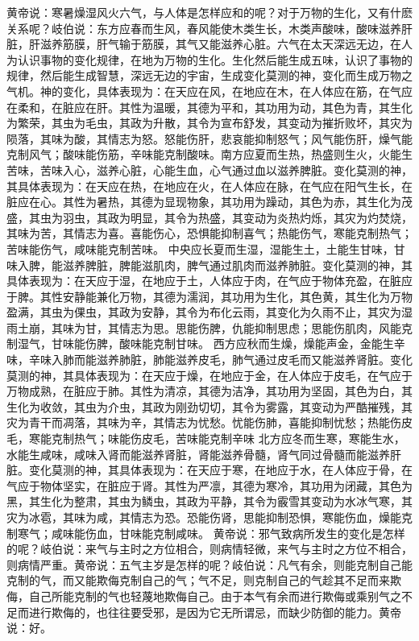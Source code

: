 \documentclass[a4paper,12pt,UTF8,twoside]{ctexbook}
\begin{document}
黄帝说：寒暑燥湿风火六气，与人体是怎样应和的呢？对于万物的生化，又有什麽关系呢？岐伯说：东方应春而生风，春风能使木类生长，木类声酸味，酸味滋养肝脏，肝滋养筋膜，肝气输于筋膜，其气又能滋养心脏。六气在太天深远无边，在人为认识事物的变化规律，在地为万物的生化。生化然后能生成五味，认识了事物的规律，然后能生成智慧，深远无边的宇宙，生成变化莫测的神，变化而生成万物之气机。神的变化，具体表现为：在天应在风，在地应在木，在人体应在筋，在气应在柔和，在脏应在肝。其性为温暖，其德为平和，其功用为动，其色为青，其生化为繁荣，其虫为毛虫，其政为升散，其令为宣布舒发，其变动为摧折败坏，其灾为陨落，其味为酸，其情志为怒。怒能伤肝，悲哀能抑制怒气；风气能伤肝，燥气能克制风气；酸味能伤筋，辛味能克制酸味。南方应夏而生热，热盛则生火，火能生苦味，苦味入心，滋养心脏，心能生血，心气通过血以滋养脾脏。变化莫测的神，其具体表现为：在天应在热，在地应在火，在人体应在脉，在气应在阳气生长，在脏应在心。其性为暑热，其德为显现物象，其功用为躁动，其色为赤，其生化为茂盛，其虫为羽虫，其政为明显，其令为热盛，其变动为炎热灼烁，其灾为灼焚烧，其味为苦，其情志为喜。喜能伤心，恐惧能抑制喜气；热能伤气，寒能克制热气；苦味能伤气，咸味能克制苦味。
中央应长夏而生湿，湿能生土，土能生甘味，甘味入脾，能滋养脾脏，脾能滋肌肉，脾气通过肌肉而滋养肺脏。变化莫测的神，其具体表现为：在天应于湿，在地应于土，人体应于肉，在气应于物体充盈，在脏应于脾。其性安静能兼化万物，其德为濡润，其功用为生化，其色黄，其生化为万物盈满，其虫为倮虫，其政为安静，其令为布化云雨，其变化为久雨不止，其灾为湿雨土崩，其味为甘，其情志为思。思能伤脾，仇能抑制思虑；思能伤肌肉，风能克制湿气，甘味能伤脾，酸味能克制甘味。
西方应秋而生燥，燥能声金，金能生辛味，辛味入肺而能滋养肺脏，肺能滋养皮毛，肺气通过皮毛而又能滋养肾脏。变化莫测的神，其具体表现为：在天应于燥，在地应于金，在人体应于皮毛，在气应于万物成熟，在脏应于肺。其性为清凉，其德为洁净，其功用为坚固，其色为白，其生化为收敛，其虫为介虫，其政为刚劲切切，其令为雾露，其变动为严酷摧残，其灾为青干而凋落，其味为辛，其情志为忧愁。忧能伤肺，喜能抑制忧愁；热能伤皮毛，寒能克制热气；味能伤皮毛，苦味能克制辛味
北方应冬而生寒，寒能生水，水能生咸味，咸味入肾而能滋养肾脏，肾能滋养骨髓，肾气同过骨髓而能滋养肝脏。变化莫测的神，其具体表现为：在天应于寒，在地应于水，在人体应于骨，在气应于物体坚实，在脏应于肾。其性为严凛，其德为寒冷，其功用为闭藏，其色为黑，其生化为整肃，其虫为鳞虫，其政为平静，其令为霰雪其变动为水冰气寒，其灾为冰雹，其味为咸，其情志为恐。恐能伤肾，思能抑制恐惧，寒能伤血，燥能克制寒气；咸味能伤血，甘味能克制咸味。
黄帝说：邪气致病所发生的变化是怎样的呢？岐伯说：来气与主时之方位相合，则病情轻微，来气与主时之方位不相合，则病情严重。黄帝说：五气主岁是怎样的呢？岐伯说：凡气有余，则能克制自己能克制的气，而又能欺侮克制自己的气；气不足，则克制自己的气趁其不足而来欺侮，自己所能克制的气也轻蔑地欺侮自己。由于本气有余而进行欺侮或乘别气之不足而进行欺侮的，也往往要受邪，是因为它无所谓忌，而缺少防御的能力。黄帝说：好。
\end{document}
